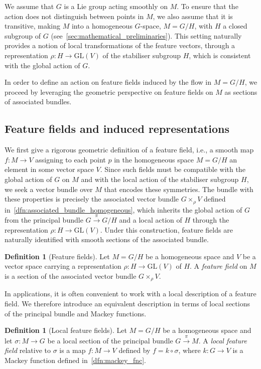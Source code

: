 \documentclass[12pt,a4paper]{article}
\numberwithin{equation}{section}
\theoremstyle{plain}
\theoremstyle{definition}
\newtheorem{definition}[theorem]{Definition}
\theoremstyle{remark}
\begin{document}
We assume that $G$ is a Lie group acting smoothly on $M$. To ensure that the action does not distinguish between points in $M$, we also assume that it is transitive, making $M$ into a homogeneous $G$-space, $M=G/H$, with $H$ a closed subgroup of $G$ (see~\cref{sec:mathematical_preliminaries}). This setting naturally provides a notion of local transformations of the feature vectors, through a representation $\rho: H \to \mathrm{GL}(V)$ of the stabiliser subgroup $H$, which is consistent with the global action of $G$.

In order to define an action on feature fields induced by the flow in $M=G/H$, we proceed by leveraging the geometric perspective on feature fields on $M$ as sections of associated bundles.


\subsection{Feature fields and induced representations}\label{sec:feature_fields_and_induced_representations}
We first give a rigorous geometric definition of a feature field, i.e., a smooth map $f:M \to V$ assigning to each point $p$ in the homogeneous space $M=G/H$ an element in some vector space $V$. Since such fields must be compatible with the global action of $G$ on $M$ and with the local action of the stabiliser subgroup $H$, we seek a vector bundle over $M$ that encodes these symmetries. The bundle with these properties is precisely the associated vector bundle $G \times_{\rho} V$ defined in~\cref{dfn:associated_bundle_homogeneous}, which inherits the global action of $G$ from the principal bundle $G \overset{\pi}{\to} G/H$ and a local action of $H$ through the representation $\rho: H \to \mathrm{GL}(V)$. Under this construction, feature fields are naturally identified with smooth sections of the associated bundle.

\begin{definition}[Feature fields]\label{dfn:feature_fields}
    Let $M=G/H$ be a homogeneous space and $V$ be a vector space carrying a representation $\rho:H \to \mathrm{GL}(V)$ of $H$. A \textit{feature field} on $M$ is a section of the associated vector bundle $G \times_{\rho} V$. 
\end{definition}

In applications, it is often convenient to work with a local description of a feature field. We therefore introduce an equivalent description in terms of local sections of the principal bundle and Mackey functions.
\begin{definition}[Local feature fields]\label{dfn:local_feature_fields}
    Let $M=G/H$ be a homogeneous space and let $\sigma:M\to G$ be a local section of the principal bundle $G\overset{\pi}{\to}M$. A \textit{local feature field} relative to $\sigma$ is a map $f:M\to V$ defined by $f=k\circ\sigma$, where $k:G\to V$ is a Mackey function defined in~\cref{dfn:mackey_fnc}.
\end{definition}
\end{document}
